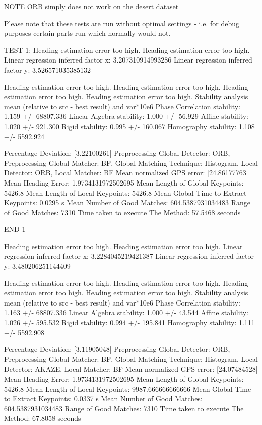 \begin{itemize}
NOTE ORB simply does not work on the desert dataset 





Please note that these tests are run without optimal settings - i.e. for debug purposes certain parts run which normally would not. 




TEST 1:
Heading estimation error too high.
Heading estimation error too high.
Linear regression inferred factor x: 3.207310914993286
Linear regression inferred factor y: 3.526571035385132 

Heading estimation error too high.
Heading estimation error too high.
Heading estimation error too high.
Heading estimation error too high.
Stability analysis mean (relative to src - best result) and var*10e6
Phase Correlation stability: 1.159 +/- 68807.336
Linear Algebra stability: 1.000 +/- 56.929
Affine stability: 1.020 +/- 921.300
Rigid stability: 0.995 +/- 160.067
Homography stability: 1.108 +/- 5592.924

Percentage Deviation: [3.22100261] %
Preprocessing Global Detector: ORB, Preprocessing Global Matcher: BF, Global Matching Technique: Histogram, Local Detector: ORB, Local Matcher: BF
Mean normalized GPS error: [24.86177763]
 Mean Heading Error: 1.9734131972502695
Mean Length of Global Keypoints: 5426.8
Mean Length of Local Keypoints: 5426.8
Mean Global Time to Extract Keypoints: 0.0295 s
Mean Number of Good Matches: 604.5387931034483
Range of Good Matches: 7310
Time taken to execute The Method: 57.5468 seconds



END 1

Heading estimation error too high.
Heading estimation error too high.
Linear regression inferred factor x: 3.2284045219421387
Linear regression inferred factor y: 3.480206251144409

Heading estimation error too high.
Heading estimation error too high.
Heading estimation error too high.
Heading estimation error too high.
Stability analysis mean (relative to src - best result) and var*10e6
Phase Correlation stability: 1.163 +/- 68807.336
Linear Algebra stability: 1.000 +/- 43.544
Affine stability: 1.026 +/- 595.532
Rigid stability: 0.994 +/- 195.841
Homography stability: 1.111 +/- 5592.908

Percentage Deviation: [3.11905048] %
Preprocessing Global Detector: ORB, Preprocessing Global Matcher: BF, Global Matching Technique: Histogram, Local Detector: AKAZE, Local Matcher: BF
Mean normalized GPS error: [24.07484528]
 Mean Heading Error: 1.9734131972502695
Mean Length of Global Keypoints: 5426.8
Mean Length of Local Keypoints: 9987.666666666666
Mean Global Time to Extract Keypoints: 0.0337 s
Mean Number of Good Matches: 604.5387931034483
Range of Good Matches: 7310
Time taken to execute The Method: 67.8058 seconds



\end{itemize}
